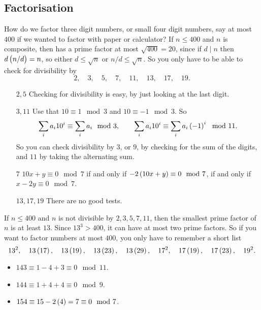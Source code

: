 \subsection{Factorisation}

How do we factor three digit numbers, or small four digit numbers, say at most $ 400 $ if we wanted to factor with paper or calculator? If $ n \le 400 $ and $ n $ is composite, then has a prime factor at most $ \sqrt{400} = 20 $, since if $ d \mid n $ then $ d\br{n / d} = n $, so either $ d \le \sqrt{n} $ or $ n / d \le \sqrt{n} $. So you only have to be able to check for divisibility by
$$ 2, \quad 3, \quad 5, \quad 7, \quad 11, \quad 13, \quad 17, \quad 19. $$
\begin{itemize}[leftmargin=0.75in]
\item[$ 2, 5 $] Checking for divisibility is easy, by just looking at the last digit.
\item[$ 3, 11 $] Use that $ 10 \equiv 1 \mod 3 $ and $ 10 \equiv -1 \mod 3 $. So
$$ \sum_i a_i10^i \equiv \sum_i a_i \mod 3, \qquad \sum_i a_i10^i \equiv \sum_i a_i\br{-1}^i \mod 11. $$
So you can check divisibility by $ 3 $, or $ 9 $, by checking for the sum of the digits, and $ 11 $ by taking the alternating sum.
\item[$ 7 $] $ 10x + y \equiv 0 \mod 7 $ if and only if $ -2\br{10x + y} \equiv 0 \mod 7 $, if and only if $ x - 2y \equiv 0 \mod 7 $.
\item[$ 13, 17, 19 $] There are no good tests.
\end{itemize}
If $ n \le 400 $ and $ n $ is not divisible by $ 2, 3, 5, 7, 11 $, then the smallest prime factor of $ n $ is at least $ 13 $. Since $ 13^3 > 400 $, it can have at most two prime factors. So if you want to factor numbers at most $ 400 $, you only have to remember a short list
$$ 13^2, \quad 13\br{17}, \quad 13\br{19}, \quad 13\br{23}, \quad 13\br{29}, \quad 17^2, \quad 17\br{19}, \quad 17\br{23}, \quad 19^2. $$

\begin{example*}
\hfill
\begin{itemize}
\item $ 143 \equiv 1 - 4 + 3 \equiv 0 \mod 11 $.
\item $ 144 \equiv 1 + 4 + 4 \equiv 0 \mod 9 $.
\item $ 154 \equiv 15 - 2\br{4} = 7 \equiv 0 \mod 7 $.
\end{itemize}
\end{example*}


